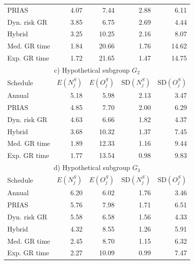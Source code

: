\begin{table}
\begin{tabular}{lrrrr}
    PRIAS          & 4.07            & 7.44                & 2.88          & 6.11    \\
    Dyn. risk GR       & 3.85            & 6.75                & 2.69          & 4.44              \\
    Hybrid       & 3.25            & 10.25               & 2.16          & 8.07              \\
    Med. GR time & 1.84            & 20.66               & 1.76          & 14.62             \\
    Exp. GR time & 1.72            & 21.65               & 1.47          & 14.75             \\
    \hline      
    \multicolumn{5}{c}{c) Hypothetical subgroup $G_2$}\\
    \hline
    Schedule        & $E(N^S_j)$ & $E(O^S_j)$ & ${\mbox{SD}(N^S_j)}$ & ${\mbox{SD}(O^S_j)}$ \\
    \hline
    Annual         & 5.18            & 5.98                & 2.13          & 3.47              \\
    PRIAS          & 4.85            & 7.70                & 2.00          & 6.29        \\
    Dyn. risk GR       & 4.63            & 6.66                & 1.82          & 4.37              \\
    Hybrid       & 3.68            & 10.32                & 1.37          & 7.45              \\
    Med. GR time & 1.89             & 12.33               & 1.16          & 9.44              \\
    Exp. GR time & 1.77            & 13.54               & 0.98          & 9.83              \\
    \hline      
    \multicolumn{5}{c}{d) Hypothetical subgroup $G_3$}\\
    \hline
    Schedule        & $E(N^S_j)$ & $E(O^S_j)$ & ${\mbox{SD}(N^S_j)}$ & ${\mbox{SD}(O^S_j)}$ \\
    \hline
    Annual         & 6.20             & 6.02                & 1.76          & 3.46              \\
    PRIAS          & 5.76             & 7.98                & 1.71         & 6.51        \\
    Dyn. risk GR       & 5.58            & 6.58                & 1.56          & 4.33              \\
    Hybrid       & 4.32            & 8.55                & 1.26          & 5.91              \\
    Med. GR time & 2.45            & 8.70                & 1.15          & 6.32              \\
    Exp. GR time & 2.27            & 10.09               & 0.99          & 7.47              \\
    \hline     
    \end{tabular}
    \end{table}

